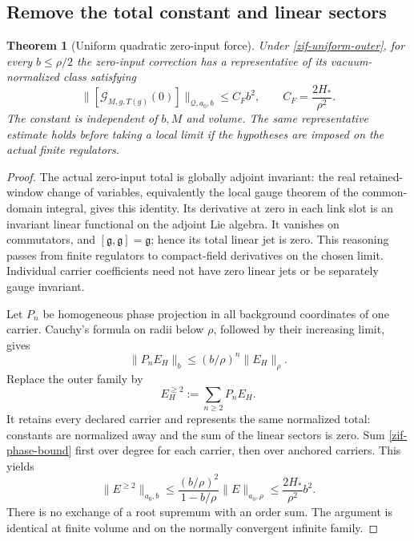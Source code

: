 \documentclass[11pt]{article}
\newtheorem{theorem}{Theorem}[section]
\theoremstyle{remark}
\begin{document}
\subsection{Remove the total constant and linear sectors}
\label{zif-force-section}

\begin{theorem}[Uniform quadratic zero-input force]
\label{zif-theorem}
Under \eqref{zif-uniform-outer}, for every $b\le\rho/2$ the
zero-input correction has a representative of its
vacuum-normalized class satisfying
\begin{equation}
 \|[\mathcal G_{M,g,T(g)}(0)]\|_{\mathcal Q,a_0,b}
       \le C_F b^2,
 \qquad C_F=\frac{2H_*}{\rho^2}.
 \label{zif-force-bound}
\end{equation}
The constant is independent of $b,M$ and volume. The same
representative estimate holds before taking a local limit if
the hypotheses are imposed on the actual finite regulators.
\end{theorem}

\begin{proof}
The actual zero-input total is globally adjoint invariant:
the real retained-window change of variables, equivalently
the local gauge theorem of the common-domain integral, gives
this identity. Its derivative at zero in each link slot is
an invariant linear functional on the adjoint Lie algebra.
It vanishes on commutators, and
$[\mathfrak g,\mathfrak g]=\mathfrak g$; hence its total
linear jet is zero. This reasoning passes from finite
regulators to compact-field derivatives on the chosen limit.
Individual carrier coefficients need not have zero linear
jets or be separately gauge invariant.

Let $P_n$ be homogeneous phase projection in all background
coordinates of one carrier. Cauchy's formula on radii below
$\rho$, followed by their increasing limit, gives
\begin{equation}
 \|P_n E_H\|_b\le(b/\rho)^n\|E_H\|_\rho.
 \label{zif-phase-bound}
\end{equation}
Replace the outer family by
\begin{equation}
 E_H^{\ge2}:=\sum_{n\ge2}P_nE_H.
 \label{zif-representative}
\end{equation}
It retains every declared carrier and represents the same
normalized total: constants are normalized away and the
sum of the linear sectors is zero. Sum
\eqref{zif-phase-bound} first over degree for each carrier,
then over anchored carriers. This yields
\begin{equation}
 \|E^{\ge2}\|_{a_0,b}
 \le\frac{(b/\rho)^2}{1-b/\rho}\|E\|_{a_0,\rho}
 \le\frac{2H_*}{\rho^2}b^2.
 \label{zif-geometric-bound}
\end{equation}
There is no exchange of a root supremum with an order sum.
The argument is identical at finite volume and on the
normally convergent infinite family.
\end{proof}
\end{document}
